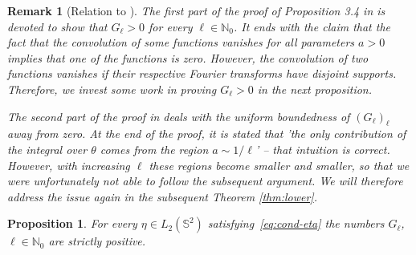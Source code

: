 \documentclass[a4paper,11pt,DIV=11,%
abstract=on%
]{scrartcl}
\newtheorem{rem}[thm]{Remark}
\newtheorem{prop}[thm]{Proposition}
\def\N{{\mathbb N}}
\newcommand{\blue}[1]{#1}
\begin{document}
\begin{rem}[Relation to {\cite[Proposition 3.4]{AV99}}]
The first part of the proof of Proposition 3.4 in \cite{AV99} is devoted to show that $G_\ell >0$ for every $\ell \in \mathbb N_0$.
It ends with the claim that the fact that the convolution of some functions 
vanishes for all parameters $a >0$
implies that one of the functions is zero.
However, the convolution of two functions vanishes if their respective Fourier transforms have disjoint supports.
Therefore, we invest some work in proving $G_\ell >0$ in the next proposition.

The second part of the proof in \cite{AV99} deals with the uniform boundedness of $(G_\ell)_\ell$ away from zero.
At the end of the proof, it is stated that 'the only contribution of the integral over $\theta$ comes from the region
$a \sim 1/\ell$' \blue{-- that intuition is correct.}
However, with increasing $\ell$ these regions become smaller and smaller, so that we were unfortunately not able to follow the subsequent
argument. We will therefore address the issue again in the subsequent Theorem \ref{thm:lower}.
\end{rem}


\begin{prop}\label{prop-strictly-positive}
	For every $\eta\in L_2(\mathbb S^2)$ satisfying~\eqref{eq:cond-eta} 
	the numbers $G_\ell$, $\ell\in\N_0$ are strictly positive.
\end{prop}
\end{document}
